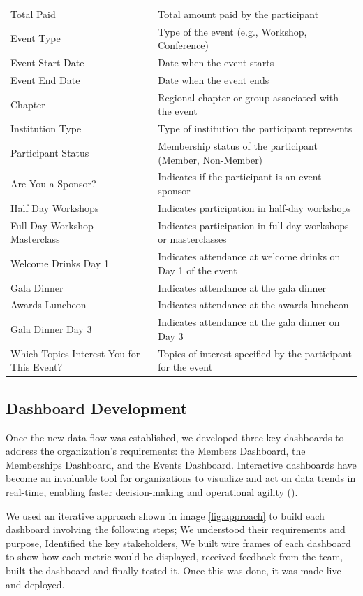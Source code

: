 \documentclass[11pt,a4paper,]{article}
\begin{document}
\begin{longtable}[t]{ll}
Total Paid & Total amount paid by the participant\\
\addlinespace
Event Type & Type of the event (e.g., Workshop, Conference)\\
Event Start Date & Date when the event starts\\
Event End Date & Date when the event ends\\
Chapter & Regional chapter or group associated with the event\\
Institution Type & Type of institution the participant represents\\
\addlinespace
Participant Status & Membership status of the participant (Member, Non-Member)\\
Are You a Sponsor? & Indicates if the participant is an event sponsor\\
Half Day Workshops & Indicates participation in half-day workshops\\
Full Day Workshop - Masterclass & Indicates participation in full-day workshops or masterclasses\\
Welcome Drinks Day 1 & Indicates attendance at welcome drinks on Day 1 of the event\\
\addlinespace
Gala Dinner & Indicates attendance at the gala dinner\\
Awards Luncheon & Indicates attendance at the awards luncheon\\
Gala Dinner Day 3 & Indicates attendance at the gala dinner on Day 3\\
Which Topics Interest You for This Event? & Topics of interest specified by the participant for the event\\*
\end{longtable}

\subsection{Dashboard Development}\label{dashboard-development}

Once the new data flow was established, we developed three key dashboards to address the organization's requirements: the Members Dashboard, the Memberships Dashboard, and the Events Dashboard. Interactive dashboards have become an invaluable tool for organizations to visualize and act on data trends in real-time, enabling faster decision-making and operational agility (\textcite{velcu2012use}).

We used an iterative approach shown in image \ref{fig:approach} to build each dashboard involving the following steps; We understood their requirements and purpose, Identified the key stakeholders, We built wire frames of each dashboard to show how each metric would be displayed, received feedback from the team, built the dashboard and finally tested it. Once this was done, it was made live and deployed.
\end{document}
